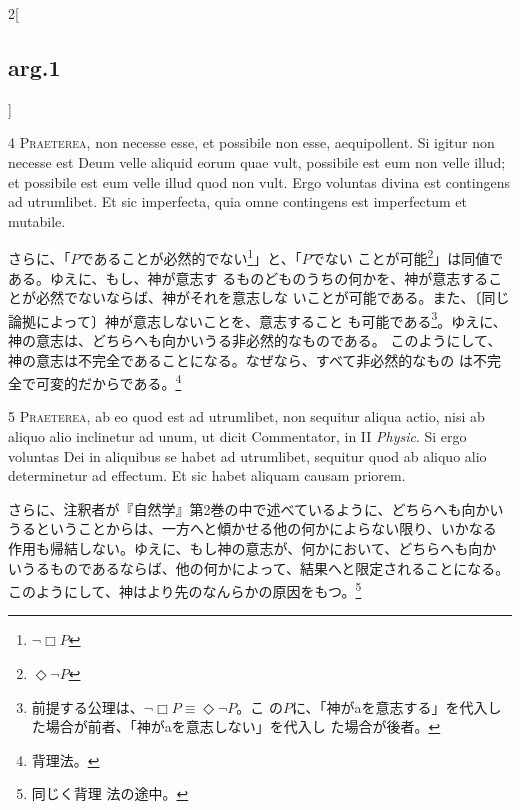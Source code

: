 \documentclass[paper=a4paper,fontsize=10pt,jafontsize=9pt,titlepage]{jlreq}
\begin{document}
\begin{paracol}{2}[\subsection{arg.1}]


{\scshape 4 Praeterea}, non necesse esse, et possibile
non esse, aequipollent. Si igitur non necesse est Deum velle aliquid
eorum quae vult, possibile est eum non velle illud; et possibile est eum
velle illud quod non vult. Ergo voluntas divina est contingens ad
utrumlibet. Et sic imperfecta, quia omne contingens est imperfectum et
mutabile.

\switchcolumn

さらに、「$P$であることが必然的でない\footnote{$\lnot \Box P$}」と、「$P$でない
ことが可能\footnote{$\Diamond \lnot P$}」は同値である。ゆえに、もし、神が意志す
るものどものうちの何かを、神が意志することが必然でないならば、神がそれを意志しな
いことが可能である。また、〔同じ論拠によって〕神が意志しないことを、意志すること
も可能である\footnote{前提する公理は、$\lnot \Box P \equiv \Diamond \lnot P$。こ
の$P$に、「神がaを意志する」を代入した場合が前者、「神がaを意志しない」を代入し
た場合が後者。}。ゆえに、神の意志は、どちらへも向かいうる非必然的なものである。
このようにして、神の意志は不完全であることになる。なぜなら、すべて非必然的なもの
は不完全で可変的だからである。\footnote{背理法。}



{\scshape 5 Praeterea}, ab eo quod est ad utrumlibet,
non sequitur aliqua actio, nisi ab aliquo alio inclinetur ad unum, ut
dicit Commentator, in II {\itshape Physic}. Si ergo voluntas Dei in aliquibus se
habet ad utrumlibet, sequitur quod ab aliquo alio determinetur ad
effectum. Et sic habet aliquam causam priorem.

\switchcolumn

さらに、注釈者が『自然学』第2巻の中で述べているように、どちらへも向かい
 うるということからは、一方へと傾かせる他の何かによらない限り、いかなる
 作用も帰結しない。ゆえに、もし神の意志が、何かにおいて、どちらへも向か
 いうるものであるならば、他の何かによって、結果へと限定されることになる。
 このようにして、神はより先のなんらかの原因をもつ。\footnote{同じく背理
 法の途中。}




\end{paracol}
\end{document}
